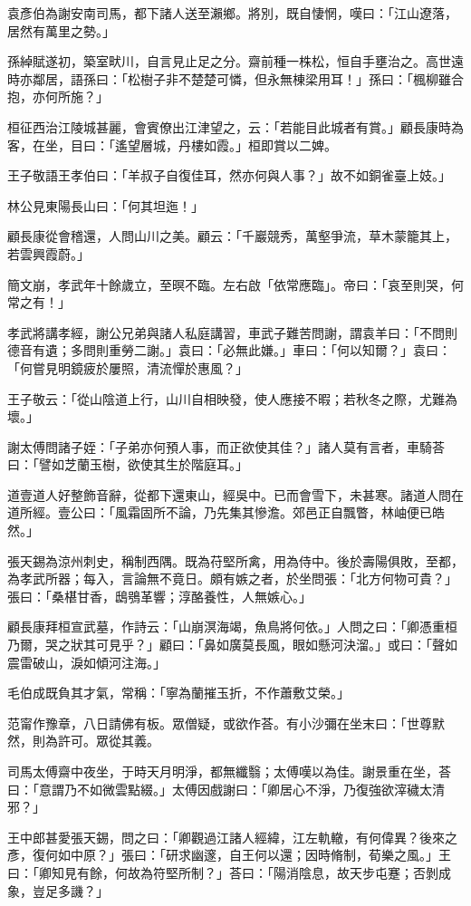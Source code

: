 袁彥伯為謝安南司馬，都下諸人送至瀨鄉。將別，既自悽惘，嘆曰：「江山遼落，居然有萬里之勢。」

孫綽賦遂初，築室畎川，自言見止足之分。齋前種一株松，恒自手壅治之。高世遠時亦鄰居，語孫曰：「松樹子非不楚楚可憐，但永無棟梁用耳！」孫曰：「楓柳雖合抱，亦何所施？」

桓征西治江陵城甚麗，會賓僚出江津望之，云：「若能目此城者有賞。」顧長康時為客，在坐，目曰：「遙望層城，丹樓如霞。」桓即賞以二婢。

王子敬語王孝伯曰：「羊叔子自復佳耳，然亦何與人事？」故不如銅雀臺上妓。」

林公見東陽長山曰：「何其坦迤！」

顧長康從會稽還，人問山川之美。顧云：「千巖競秀，萬壑爭流，草木蒙籠其上，若雲興霞蔚。」

簡文崩，孝武年十餘歲立，至暝不臨。左右啟「依常應臨」。帝曰：「哀至則哭，何常之有！」

孝武將講孝經，謝公兄弟與諸人私庭講習，車武子難苦問謝，謂袁羊曰：「不問則德音有遺；多問則重勞二謝。」袁曰：「必無此嫌。」車曰：「何以知爾？」袁曰：「何嘗見明鏡疲於屢照，清流憚於惠風？」

王子敬云：「從山陰道上行，山川自相映發，使人應接不暇；若秋冬之際，尤難為壞。」

謝太傅問諸子姪：「子弟亦何預人事，而正欲使其佳？」諸人莫有言者，車騎荅曰：「譬如芝蘭玉樹，欲使其生於階庭耳。」

道壹道人好整飾音辭，從都下還東山，經吳中。已而會雪下，未甚寒。諸道人問在道所經。壹公曰：「風霜固所不論，乃先集其慘澹。郊邑正自飄瞥，林岫便已皓然。」

張天錫為涼州刺史，稱制西隅。既為苻堅所禽，用為侍中。後於壽陽俱敗，至都，為孝武所器；每入，言論無不竟日。頗有嫉之者，於坐問張：「北方何物可貴？」張曰：「桑椹甘香，鴟鴞革響；淳酪養性，人無嫉心。」

顧長康拜桓宣武墓，作詩云：「山崩溟海竭，魚鳥將何依。」人問之曰：「卿憑重桓乃爾，哭之狀其可見乎？」顧曰：「鼻如廣莫長風，眼如懸河決溜。」或曰：「聲如震雷破山，淚如傾河注海。」

毛伯成既負其才氣，常稱：「寧為蘭摧玉折，不作蕭敷艾榮。」

范甯作豫章，八日請佛有板。眾僧疑，或欲作荅。有小沙彌在坐末曰：「世尊默然，則為許可。眾從其義。

司馬太傅齋中夜坐，于時天月明淨，都無纖翳；太傅嘆以為佳。謝景重在坐，荅曰：「意謂乃不如微雲點綴。」太傅因戲謝曰：「卿居心不淨，乃復強欲滓穢太清邪？」

王中郎甚愛張天錫，問之曰：「卿觀過江諸人經緯，江左軌轍，有何偉異？後來之彥，復何如中原？」張曰：「研求幽邃，自王何以還；因時脩制，荀樂之風。」王曰：「卿知見有餘，何故為符堅所制？」荅曰：「陽消陰息，故天步屯蹇；否剝成象，豈足多譏？」

